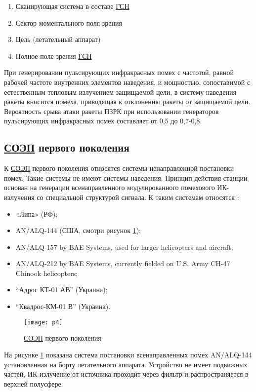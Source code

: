 \begin{enumerate}
	\item Сканирующая система в составе \hyperref[acroGSN]{ГСН}
	\item Сектор моментального поля зрения
	\item Цель (летательный аппарат)
	\item Полное поле зрения \hyperref[acroGSN]{ГСН}	
\end{enumerate}
	
При генерировании пульсирующих инфракрасных помех с частотой, равной рабочей частоте внутренних элементов наведения, и мощностью, сопоставимой с естественным тепловым излучением защищаемой цели, в систему наведения ракеты вносится помеха, приводящая к отклонению ракеты от защищаемой цели. Вероятность срыва атаки ракеты ПЗРК при использовании генераторов пульсирующих инфракрасных помех составляет от 0,5 до 0,7-0,8.

\subsection{ \hyperref[acroSOEP]{СОЭП} первого поколения}	

К \hyperref[acroSOEP]{СОЭП} первого поколения относятся системы ненаправленной постановки помех. Такие системы не имеют системы наведения. Принцип действия станции основан на генерации всенаправленного модулированного помехового ИК-излучения со специальной структурой сигнала. К таким системам относятся \cite[]{SOEP_LIPA}:

\begin{itemize}
	\item «Липа» (РФ);	
	\item AN/ALQ-144 (США, смотри рисунок \ref{fig:alq});	
	\item AN/ALQ-157 by BAE Systems, used for larger helicopters and aircraft;
	\item AN/ALQ-212 by BAE Systems, currently fielded on U.S. Army CH-47 Chinook helicopters;
	\item “Адрос КТ-01 АВ” (Украина);
	\item “Квадрос-КМ-01 В” (Украина). 		
\end{itemize}

\begin{figure}[ht]
	\centering
	\texttt{[image: p4]} 
	\caption{ \hyperref[acroSOEP]{СОЭП} первого поколения}
	\label{fig:alq}
\end{figure}
На рисунке \ref{fig:alq} показана система постановки всенаправленных помех AN/ALQ-144 установленная на борту летательного аппарата. Устройство не имеет подвижных частей, ИК излучение от источника проходит через фильтр и распространяется в верхней полусфере.

